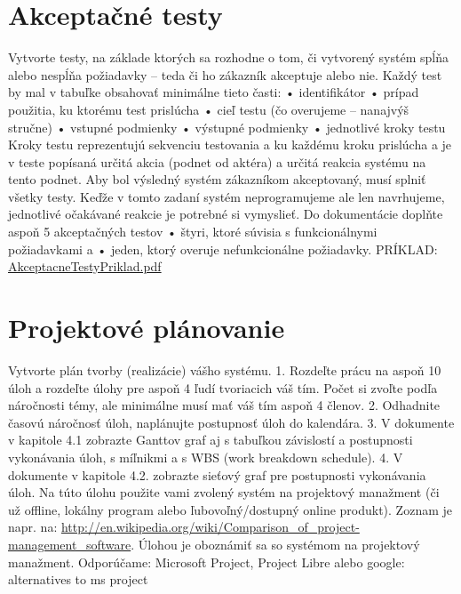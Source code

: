 \section{Akceptačné testy}
Vytvorte testy, na základe ktorých sa rozhodne o tom, či vytvorený systém spĺňa alebo nespĺňa
požiadavky – teda či ho zákazník akceptuje alebo nie. Každý test by mal v tabuľke obsahovať minimálne
tieto časti:
• identifikátor
• prípad použitia, ku ktorému test prislúcha
• cieľ testu (čo overujeme – nanajvýš stručne)
• vstupné podmienky
• výstupné podmienky
• jednotlivé kroky testu
Kroky testu reprezentujú sekvenciu testovania a ku každému kroku prislúcha a je v teste popísaná určitá
akcia (podnet od aktéra) a určitá reakcia systému na tento podnet. Aby bol výsledný systém zákazníkom
akceptovaný, musí splniť všetky testy. Keďže v tomto zadaní systém neprogramujeme ale len
navrhujeme, jednotlivé očakávané reakcie je potrebné si vymyslieť.
Do dokumentácie doplňte aspoň 5 akceptačných testov
• štyri, ktoré súvisia s funkcionálnymi požiadavkami a
• jeden, ktorý overuje nefunkcionálne požiadavky.
PRÍKLAD: \href{https://uim.fei.stuba.sk/wp-content/uploads/2022/10/AkceptacneTestyPriklad.pdf}{AkceptacneTestyPriklad.pdf}


\section{Projektové plánovanie}
Vytvorte plán tvorby (realizácie) vášho systému.
1. Rozdeľte prácu na aspoň 10 úloh a rozdeľte úlohy pre aspoň 4 ľudí tvoriacich váš tím. Počet si zvoľte
podľa náročnosti témy, ale minimálne musí mať váš tím aspoň 4 členov.
2. Odhadnite časovú náročnosť úloh, naplánujte postupnosť úloh do kalendára.
3. V dokumente v kapitole 4.1 zobrazte Ganttov graf aj s tabuľkou závislostí a postupnosti vykonávania
úloh, s míľnikmi a s WBS (work breakdown schedule).
4. V dokumente v kapitole 4.2. zobrazte sieťový graf pre postupnosti vykonávania úloh.
Na túto úlohu použite vami zvolený systém na projektový manažment (či už offline, lokálny program
alebo ľubovoľný/dostupný online produkt). Zoznam je napr. na:
\url{http://en.wikipedia.org/wiki/Comparison_of_project-management_software}. Úlohou je oboznámiť sa
so systémom na projektový manažment.
Odporúčame: Microsoft Project, Project Libre alebo google: alternatives to ms project


